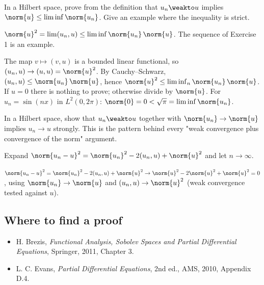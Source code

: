 \begin{exercise}
  In a Hilbert space, prove from the definition that $u_n \weakto u$ implies $\norm{u} \le \liminf\norm{u_n}$. Give an example where the inequality is strict.
  \begin{hint}
    $\norm{u}^2 = \lim (u_n, u) \le \liminf \norm{u_n}\,\norm{u}$. The sequence of Exercise 1 is an example.
  \end{hint}
  \begin{solution}
    The map $v \mapsto (v, u)$ is a bounded linear functional, so $(u_n, u) \to (u, u) = \norm{u}^2$. By Cauchy--Schwarz, $(u_n, u) \le \norm{u_n}\,\norm{u}$, hence $\norm{u}^2 \le \liminf_n\norm{u_n}\,\norm{u}$. If $u = 0$ there is nothing to prove; otherwise divide by $\norm{u}$. For $u_n = \sin(nx)$ in $L^2(0,2\pi)$: $\norm{0} = 0 < \sqrt\pi = \liminf\norm{u_n}$.
  \end{solution}
\end{exercise}

\begin{exercise}
  In a Hilbert space, show that $u_n \weakto u$ together with $\norm{u_n} \to \norm{u}$ implies $u_n \to u$ strongly. This is the pattern behind every "weak convergence plus convergence of the norm" argument.
  \begin{hint}
    Expand $\norm{u_n - u}^2 = \norm{u_n}^2 - 2(u_n, u) + \norm{u}^2$ and let $n \to \infty$.
  \end{hint}
  \begin{solution}
    $\norm{u_n - u}^2 = \norm{u_n}^2 - 2(u_n, u) + \norm{u}^2 \to \norm{u}^2 - 2\norm{u}^2 + \norm{u}^2 = 0$, using $\norm{u_n} \to \norm{u}$ and $(u_n, u) \to \norm{u}^2$ (weak convergence tested against $u$).
  \end{solution}
\end{exercise}

\subsection*{Where to find a proof}

\begin{itemize}
\item H. Brezis, \emph{Functional Analysis, Sobolev Spaces and Partial Differential Equations}, Springer, 2011, Chapter 3.
\item L. C. Evans, \emph{Partial Differential Equations}, 2nd ed., AMS, 2010, Appendix D.4.
\end{itemize}

